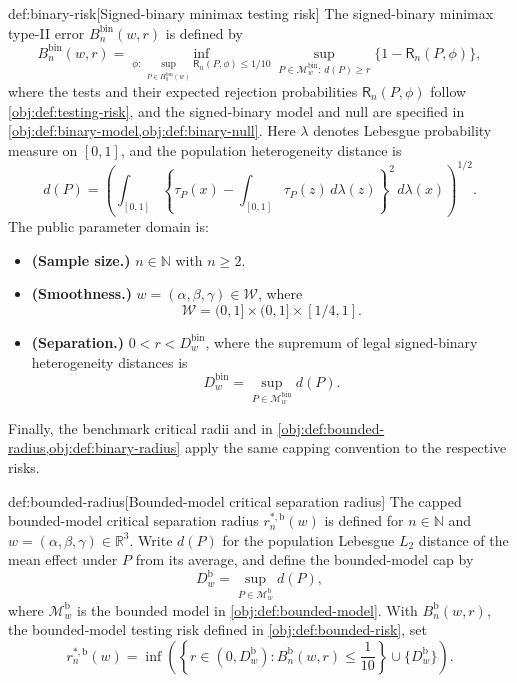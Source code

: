 \documentclass[11pt]{article}
\begin{document}
\begin{definitionv}{def:binary-risk}[Signed-binary minimax testing risk]
The signed-binary minimax type-II error \(B_n^{\mathrm{bin}}(w,r)\) is defined by
\[
B_n^{\mathrm{bin}}(w,r)
=
\inf_{\phi:\,\sup_{P\in H_0^{\mathrm{bin}}(w)}
\mathsf R_n(P,\phi)\le 1/10}
\sup_{P\in\mathcal M^{\mathrm{bin}}_w:\,d(P)\ge r}
\{1-\mathsf R_n(P,\phi)\},
\]
where the tests and their expected rejection probabilities \(\mathsf R_n(P,\phi)\) follow \cref{obj:def:testing-risk}, and the signed-binary model and null are specified in \cref{obj:def:binary-model,obj:def:binary-null}. Here \(\lambda\) denotes Lebesgue probability measure on \([0,1]\), and the population heterogeneity distance is
\[
d(P)
=
\left(
\int_{[0,1]}
\left\{\tau_P(x)-\int_{[0,1]}\tau_P(z)\,d\lambda(z)\right\}^{2}
\,d\lambda(x)
\right)^{1/2}.
\]
The public parameter domain is:
\begin{itemize}
\item \textbf{(Sample size.)} \(n\in\mathbb N\) with \(n\ge2\).
\item \textbf{(Smoothness.)} \(w=(\alpha,\beta,\gamma)\in\mathcal W\), where
\[
\mathcal W=(0,1]\times(0,1]\times[1/4,1].
\]
\item \textbf{(Separation.)} \(0<r<D_w^{\mathrm{bin}}\), where the supremum of legal signed-binary heterogeneity distances is
\[
D_w^{\mathrm{bin}}
=
\sup_{P\in\mathcal M^{\mathrm{bin}}_w}d(P).
\]
\end{itemize}
\end{definitionv}

Finally, the benchmark critical radii  and  in \cref{obj:def:bounded-radius,obj:def:binary-radius} apply the same capping convention to the respective risks.

\begin{definitionv}{def:bounded-radius}[Bounded-model critical separation radius]
The capped bounded-model critical separation radius \(r_n^{*,\mathrm b}(w)\) is defined for \(n\in\mathbb N\) and \(w=(\alpha,\beta,\gamma)\in\mathbb R^3\). Write \(d(P)\) for the population Lebesgue \(L_2\) distance of the mean effect under \(P\) from its average, and define the bounded-model cap by
\[
D_w^{\mathrm b}
=
\sup_{P\in\mathcal M^{\mathrm b}_w} d(P),
\]
where \(\mathcal M^{\mathrm b}_w\) is the bounded model in \cref{obj:def:bounded-model}. With \(B_n^{\mathrm b}(w,r)\), the bounded-model testing risk defined in \cref{obj:def:bounded-risk}, set
\[
r_n^{*,\mathrm b}(w)
=
\inf\left(
\left\{r\in(0,D_w^{\mathrm b}):B_n^{\mathrm b}(w,r)\le \frac{1}{10}\right\}
\cup\{D_w^{\mathrm b}\}
\right).
\]
\end{definitionv}
\end{document}

